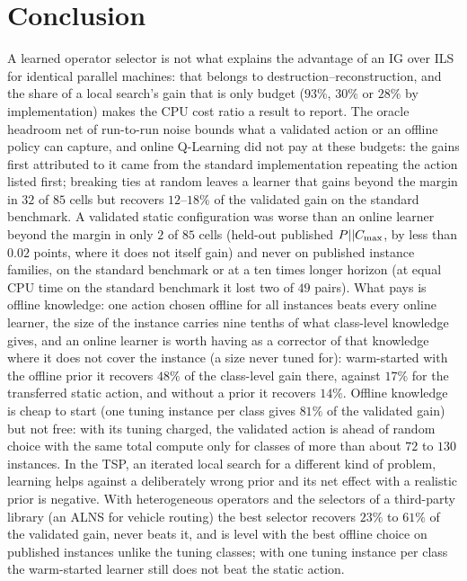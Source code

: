 \section{Conclusion}
\label{sec:conclusion}
A learned operator selector is not what explains the advantage of an IG over ILS for identical parallel machines: that belongs to destruction--reconstruction, and the share of a local search's gain that is only budget ($93\%$, $30\%$ or $28\%$ by implementation) makes the CPU cost ratio a result to report. The oracle headroom net of run-to-run noise bounds what a validated action or an offline policy can capture, and online Q-Learning did not pay at these budgets: the gains first attributed to it came from the standard implementation repeating the action listed first; breaking ties at random leaves a learner that gains beyond the margin in $32$ of $85$ cells but recovers $12$--$18\%$ of the validated gain on the standard benchmark. A validated static configuration was worse than an online learner beyond the margin in only $2$ of $85$ cells (held-out published $P||C_{\max}$, by less than $0.02$ points, where it does not itself gain) and never on published instance families, on the standard benchmark or at a ten times longer horizon (at equal CPU time on the standard benchmark it lost two of $49$ pairs). What pays is offline knowledge: one action chosen offline for all instances beats every online learner, the size of the instance carries nine tenths of what class-level knowledge gives, and an online learner is worth having as a corrector of that knowledge where it does not cover the instance (a size never tuned for): warm-started with the offline prior it recovers $48\%$ of the class-level gain there, against $17\%$ for the transferred static action, and without a prior it recovers $14\%$. Offline knowledge is cheap to start (one tuning instance per class gives $81\%$ of the validated gain) but not free: with its tuning charged, the validated action is ahead of random choice with the same total compute only for classes of more than about $72$ to $130$ instances. In the TSP, an iterated local search for a different kind of problem, learning helps against a deliberately wrong prior and its net effect with a realistic prior is negative. With heterogeneous operators and the selectors of a third-party library (an ALNS for vehicle routing) the best selector recovers $23\%$ to $61\%$ of the validated gain, never beats it, and is level with the best offline choice on published instances unlike the tuning classes; with one tuning instance per class the warm-started learner still does not beat the static action.

